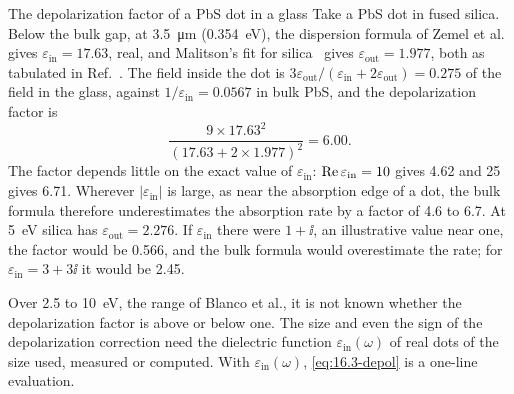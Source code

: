 \begin{workedexample}{The depolarization factor of a PbS dot in a glass}\label{we:16-depol}
Take a PbS dot in fused silica. Below the bulk gap, at \SI{3.5}{\micro m} (\SI{0.354}{eV}), the dispersion formula of Zemel et al.~\cite{zemel1965electrical} gives $\varepsilon_{\mathrm{in}} = 17.63$, real, and Malitson's fit for silica~\cite{malitson1965interspecimen} gives $\varepsilon_{\mathrm{out}} = 1.977$, both as tabulated in Ref.~\cite{polyanskiy2024refractiveindex}. The field inside the dot is $3\varepsilon_{\mathrm{out}}/(\varepsilon_{\mathrm{in}} + 2\varepsilon_{\mathrm{out}}) = 0.275$ of the field in the glass, against $1/\varepsilon_{\mathrm{in}} = 0.0567$ in bulk PbS, and the depolarization factor is
\begin{equation*}
  \frac{9 \times 17.63^2}{(17.63 + 2\times1.977)^2} = 6.00 .
\end{equation*}
The factor depends little on the exact value of $\varepsilon_{\mathrm{in}}$: $\operatorname{Re}\varepsilon_{\mathrm{in}} = 10$ gives 4.62 and 25 gives 6.71. Wherever $|\varepsilon_{\mathrm{in}}|$ is large, as near the absorption edge of a dot, the bulk formula therefore underestimates the absorption rate by a factor of 4.6 to 6.7. At \SI{5}{eV} silica has $\varepsilon_{\mathrm{out}} = 2.276$. If $\varepsilon_{\mathrm{in}}$ there were $1 + \ii$, an illustrative value near one, the factor would be 0.566, and the bulk formula would overestimate the rate; for $\varepsilon_{\mathrm{in}} = 3 + 3\ii$ it would be 2.45.
\end{workedexample}

Over 2.5 to \SI{10}{eV}, the range of Blanco et al., it is not known whether the depolarization factor is above or below one. The size and even the sign of the depolarization correction need the dielectric function $\varepsilon_{\mathrm{in}}(\omega)$ of real dots of the size used, measured or computed. With $\varepsilon_{\mathrm{in}}(\omega)$, \cref{eq:16.3-depol} is a one-line evaluation.

